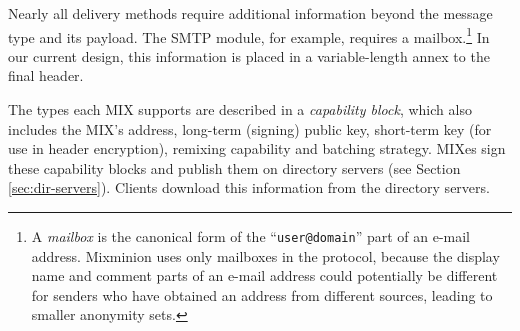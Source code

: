 \documentclass{llncs}
\begin{document}
Nearly all delivery methods require additional information beyond the
message type and its payload.  The SMTP module, for example, requires
a mailbox.\footnote{A {\it mailbox} is the canonical form of the
``{\tt user@domain}'' part of an e-mail address. Mixminion uses only
mailboxes in the protocol, because the display name and comment parts
of an e-mail address could potentially be different for senders who
have obtained an address from different sources, leading to smaller
anonymity sets.}
In our current design, this information is placed
in a variable-length annex to the final header.

%
%

The types each MIX supports are described in a \emph{capability block},
which also includes the MIX's address, long-term (signing) public key,
short-term key (for use in header encryption), remixing capability and
batching strategy. MIXes sign these capability blocks
and publish them on directory servers (see Section \ref{sec:dir-servers}).
Clients download this information from the directory servers.

%
\end{document}
